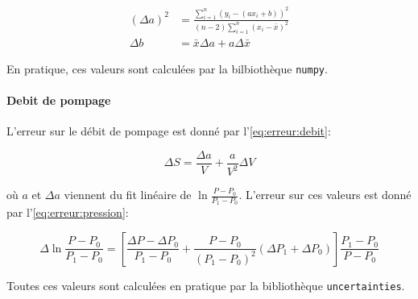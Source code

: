 \begin{equation}
    \label{eq:erreur:fit}
    \begin{aligned}
        (\Delta a)^2 &= \frac{\sum_{i=1}^{n}(y_i - (a x_i + b))^2}{(n-2) \sum_{i=1}^{n}(x_i - \bar{x})^2}\\
        \Delta b &= \bar{x} \Delta a + a \Delta \bar{x}
    \end{aligned}
\end{equation}

En pratique, ces valeurs sont calculées par la bilbiothèque \texttt{numpy}.

\paragraph*{Debit de pompage}
L'erreur sur le débit de pompage est donné par l'\autoref{eq:erreur:debit}:

\begin{equation}
    \Delta S = \frac{\Delta a}{V} + \frac{a}{V^2} \Delta V
    \label{eq:erreur:debit}
\end{equation}

où \(a\) et \(\Delta a\) viennent du fit linéaire de \(\ln{\frac{P - P_0}{P_1 - P_0}}\). L'erreur sur ces valeurs est donné par l'\autoref{eq:erreur:pression}:

\begin{equation}
    \Delta \ln{\frac{P - P_0}{P_1 - P_0}} = \left[\frac{\Delta P - \Delta P_0}{P_1 - P_0} + \frac{P - P_0}{(P_1 - P_0)^2}(\Delta P_1 + \Delta P_0)\right] \frac{P_1 - P_0}{P - P_0}
    \label{eq:erreur:pression}
\end{equation}

Toutes ces valeurs sont calculées en pratique par la bibliothèque \texttt{uncertainties}.
